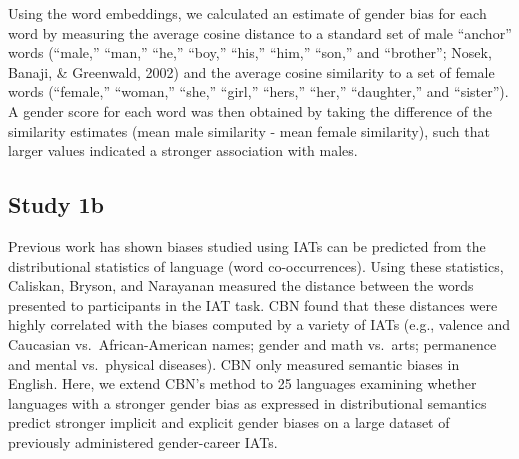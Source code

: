 \documentclass[9pt,twocolumn,twoside]{pnas-new}
\begin{document}
{Using the word embeddings, we calculated an estimate of gender bias for
each word by measuring the average cosine distance to a standard set of
male \enquote{anchor} words (\enquote{male,} \enquote{man,}
\enquote{he,} \enquote{boy,} \enquote{his,} \enquote{him,}
\enquote{son,} and \enquote{brother}; Nosek, Banaji, \& Greenwald, 2002)
and the average cosine similarity to a set of female words
(\enquote{female,} \enquote{woman,} \enquote{she,} \enquote{girl,}
\enquote{hers,} \enquote{her,} \enquote{daughter,} and
\enquote{sister}). A gender score for each word was then obtained by
taking the difference of the similarity estimates (mean male similarity
- mean female similarity), such that larger values indicated a stronger
association with males.

\subsection*{Study 1b}

Previous work has shown biases studied using IATs can be predicted from
the distributional statistics of language (word co-occurrences). Using
these statistics, Caliskan, Bryson, and Narayanan \cite[henceforth,
CBN]{caliskan2017semantics} measured the distance between the words presented to participants
in the IAT task. CBN found that these distances were highly correlated
with the biases computed by a variety of IATs (e.g., valence and
Caucasian vs.~African-American names; gender and math vs.~arts;
permanence and mental vs.~physical diseases). CBN only measured semantic
biases in English. Here, we extend CBN's method to 25 languages
examining whether languages with a stronger gender bias as expressed in
distributional semantics predict stronger implicit and explicit gender
biases on a large dataset of previously administered gender-career IATs.

}
\end{document}
